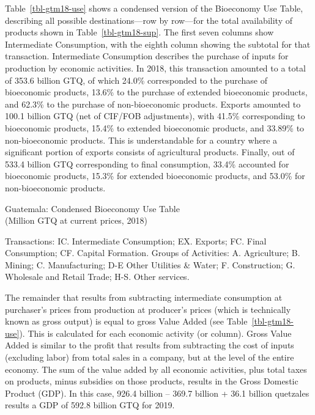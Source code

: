 \documentclass[
  letterpaper,
  DIV=11,
  numbers=noendperiod]{scrartcl}
\begin{document}
Table~\ref{tbl-gtm18-use} shows a condensed version of the Bioeconomy
Use Table, describing all possible destinations---row by row---for the
total availability of products shown in Table~\ref{tbl-gtm18-sup}. The
first seven columns show Intermediate Consumption, with the eighth
column showing the subtotal for that transaction. Intermediate
Consumption describes the purchase of inputs for production by economic
activities. In 2018, this transaction amounted to a total of 353.6
billion GTQ, of which 24.0\% corresponded to the purchase of bioeconomic
products, 13.6\% to the purchase of extended bioeconomic products, and
62.3\% to the purchase of non-bioeconomic products. Exports amounted to
100.1 billion GTQ (net of CIF/FOB adjustments), with 41.5\%
corresponding to bioeconomic products, 15.4\% to extended bioeconomic
products, and 33.89\% to non-bioeconomic products. This is
understandable for a country where a significant portion of exports
consists of agricultural products. Finally, out of 533.4 billion GTQ
corresponding to final consumption, 33.4\% accounted for bioeconomic
products, 15.3\% for extended bioeconomic products, and 53.0\% for
non-bioeconomic products.

\begin{table}

\caption{\label{tbl-gtm18-use}Guatemala: Condensed Bioeconomy Use
Table\\
(Million GTQ at current prices, 2018)}


\end{table}%

Transactions: IC. Intermediate Consumption; EX. Exports; FC. Final
Consumption; CF. Capital Formation. Groups of Activities: A.
Agriculture; B. Mining; C. Manufacturing; D-E Other Utilities \& Water;
F. Construction; G. Wholesale and Retail Trade; H-S. Other services.

The remainder that results from subtracting intermediate consumption at
purchaser's prices from production at producer's prices (which is
technically known as gross output) is equal to gross Value Added (see
Table~\ref{tbl-gtm18-use}). This is calculated for each economic
activity (or column). Gross Value Added is similar to the profit that
results from subtracting the cost of inputs (excluding labor) from total
sales in a company, but at the level of the entire economy. The sum of
the value added by all economic activities, plus total taxes on
products, minus subsidies on those products, results in the Gross
Domestic Product (GDP). In this case, 926.4 billion -- 369.7 billion +
36.1 billion quetzales results a GDP of 592.8 billion GTQ for 2019.
\end{document}
